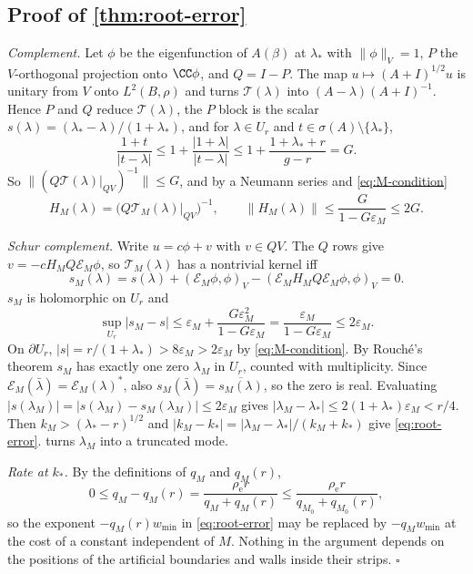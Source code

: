 \subsection{Proof of \texorpdfstring{\cref{thm:root-error}}{the root-error theorem}}
\emph{Complement.} Let $\phi$ be the eigenfunction of $A(\beta)$ at $\lambda_*$
with $\|\phi\|_V=1$, $P$ the $V$-orthogonal projection onto $\CC\phi$, and
$Q=I-P$. The map $u\mapsto(A+I)^{1/2}u$ is unitary from $V$ onto
$L^2(B,\rho)$ and turns $\mathcal T(\lambda)$ into $(A-\lambda)(A+I)^{-1}$. Hence
$P$ and $Q$ reduce $\mathcal T(\lambda)$, the $P$ block is the scalar
$s(\lambda)=(\lambda_*-\lambda)/(1+\lambda_*)$, and for $\lambda\in U_r$ and
$t\in\sigma(A)\setminus\{\lambda_*\}$,
\[
  \frac{1+t}{|t-\lambda|}\le1+\frac{|1+\lambda|}{|t-\lambda|}\le1+\frac{1+\lambda_*+r}{g-r}=G .
\]
So $\|(Q\mathcal T(\lambda)|_{QV})^{-1}\|\le G$, and by a Neumann series and
\eqref{eq:M-condition}
\[
  H_M(\lambda)=\bigl(Q\mathcal T_M(\lambda)|_{QV}\bigr)^{-1},\qquad
  \|H_M(\lambda)\|\le\frac{G}{1-G\varepsilon_M}\le2G .
\]

\emph{Schur complement.} Write $u=c\phi+v$ with $v\in QV$. The $Q$ rows give
$v=-cH_MQ\mathcal E_M\phi$, so $\mathcal T_M(\lambda)$ has a nontrivial kernel iff
\[
  s_M(\lambda)=s(\lambda)+(\mathcal E_M\phi,\phi)_V
  -(\mathcal E_MH_MQ\mathcal E_M\phi,\phi)_V=0 .
\]
$s_M$ is holomorphic on $U_r$ and
\[
  \sup_{U_r}|s_M-s|\le\varepsilon_M+\frac{G\varepsilon_M^2}{1-G\varepsilon_M}
  =\frac{\varepsilon_M}{1-G\varepsilon_M}\le2\varepsilon_M .
\]
On $\partial U_r$, $|s|=r/(1+\lambda_*)>8\varepsilon_M>2\varepsilon_M$ by
\eqref{eq:M-condition}. By Rouché's theorem $s_M$ has exactly one zero
$\lambda_M$ in $U_r$, counted with multiplicity. Since
$\mathcal E_M(\bar\lambda)=\mathcal E_M(\lambda)^*$, also
$s_M(\bar\lambda)=\overline{s_M(\lambda)}$, so the zero is real. Evaluating
$|s(\lambda_M)|=|s(\lambda_M)-s_M(\lambda_M)|\le2\varepsilon_M$ gives
$|\lambda_M-\lambda_*|\le2(1+\lambda_*)\varepsilon_M<r/4$. Then
$k_M>(\lambda_*-r)^{1/2}$ and
$|k_M-k_*|=|\lambda_M-\lambda_*|/(k_M+k_*)$ give \eqref{eq:root-error}.
 turns $\lambda_M$ into a truncated mode.

\emph{Rate at $k_*$.} By the definitions of $q_M$ and $q_M(r)$,
\[
  0\le q_M-q_M(r)=\frac{\rho_{\mathrm e}r}{q_M+q_M(r)}
  \le\frac{\rho_{\mathrm e}r}{q_{M_0}+q_{M_0}(r)},
\]
so the exponent $-q_M(r)w_{\min}$ in \eqref{eq:root-error} may be replaced by
$-q_Mw_{\min}$ at the cost of a constant independent of $M$. Nothing in the
argument depends on the positions of the artificial boundaries and walls inside their strips.
\qquad$\square$

